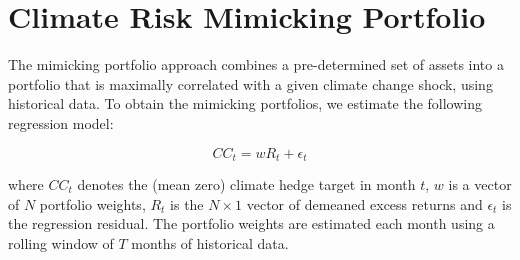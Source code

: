 \chapter{Climate Risk Mimicking Portfolio}


The mimicking portfolio approach combines a pre-determined set of 
assets into a portfolio that is maximally correlated with a given 
climate change shock, using historical data. To obtain the mimicking
portfolios, we estimate the following regression model:

\begin{equation}
    \label{eq:regression}
    CC_t = w R_t + \epsilon_t
\end{equation}

where $CC_t$ denotes the (mean zero) climate hedge target in month $t$,
$w$ is a vector of $N$ portfolio weights, $R_t$ is the $N \times 1$ vector 
of demeaned excess returns and $\epsilon_t$ is the regression residual.
The portfolio weights are estimated each month using a rolling window of
$T$ months of historical data. 